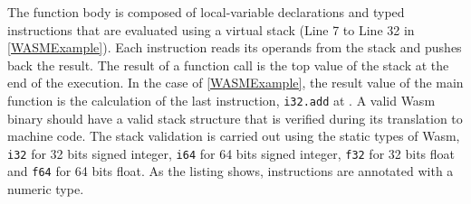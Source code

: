 The function body is composed of local-variable declarations and typed instructions that are evaluated using a virtual stack (Line 7 to Line 32 in \autoref{WASMExample}). Each instruction reads its operands from the stack and pushes back the result. The result of a function call is the top value of the stack at the end of the execution. In the case of \autoref{WASMExample}, the result value of the main function is the calculation of the last instruction, \texttt{i32.add} at . A valid Wasm  binary should have a valid stack structure that is verified during its translation to machine code. The stack validation is carried out using the static types of Wasm, \texttt{i32} for 32 bits signed integer, \texttt{i64} for 64 bits signed integer, \texttt{f32} for 32 bits float and \texttt{f64} for 64 bits float. As the listing shows, instructions are annotated with a numeric type.

\begin{code}
    \begin{minipage}[t]{0.45\linewidth}
%
\end{minipage}\hspace{10mm}
\begin{minipage}[t]{0.46\linewidth}
%
%
\end{minipage}






\end{code}

